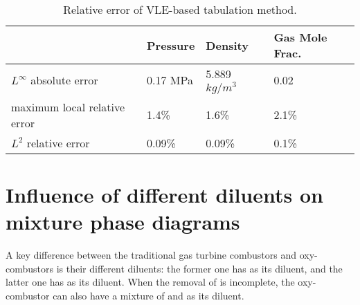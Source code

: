     \begin{table}[htbp]
        \centering
        \begin{minipage}{0.9\textwidth}
            \caption{Relative error of VLE-based tabulation method.} \label{table:error}
            \begin{center}
                \begin{tabular}{@{}l|lll@{}} %
                    \toprule
                                    &Pressure  & Density   & Gas Mole Frac.   \\ %
                    \midrule
                    $L^{\infty}$ absolute error           & 0.17 MPa        & 5.889 $kg/m^3$   & 0.02\\%
                    maximum local relative error          &  1.4\%           & 1.6\%   & 2.1\% \\ %
                     $L^2$ relative error               &  0.09\%           & 0.09\%   & 0.1\% \\ %
                    \bottomrule
                \end{tabular}

            \end{center}
        \end{minipage}

    \end{table}

    

\section{Influence of different diluents on mixture phase diagrams} \label{app:trad}
A key difference between the traditional gas turbine combustors and  oxy-combustors is their different diluents: the former one has  as its diluent, and the latter one has  as its diluent. When the removal of  is incomplete, the  oxy-combustor can also have a mixture of  and  as its diluent.

